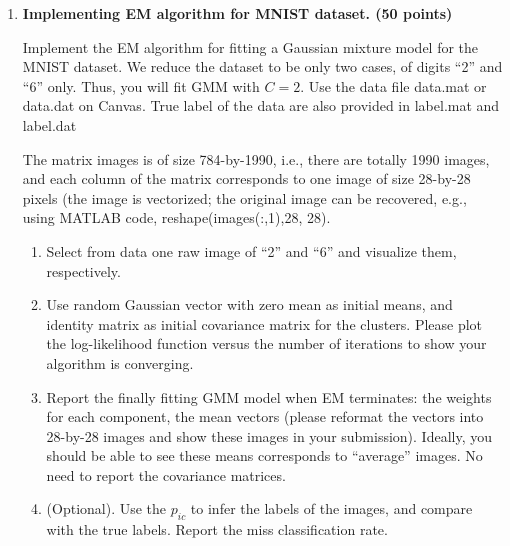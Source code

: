 \documentclass[twoside,10pt]{article}
\begin{document}
\begin{enumerate}
\item {\bf Implementing EM algorithm for MNIST dataset. (50 points)} 

 Implement the EM algorithm for fitting a Gaussian mixture model for the MNIST dataset. We reduce the dataset to be only two cases, of digits ``2'' and ``6'' only. Thus, you will fit GMM with $C = 2$. Use the data file \textsf{data.mat} or \textsf{data.dat} on Canvas. True label of the data are also provided in \textsf{label.mat} and \textsf{label.dat}

The matrix \textsf{images} is of size 784-by-1990, i.e., there are totally 1990 images, and each column of the matrix corresponds to one image of size 28-by-28 pixels (the image is vectorized; the original image can be recovered, e.g., using MATLAB code, \textsf{reshape(images(:,1),28, 28)}.


\begin{enumerate}

\item Select from data one raw image of ``2'' and ``6'' and visualize them, respectively. 

\item Use random Gaussian vector with zero mean as initial means, and identity matrix as initial covariance matrix for the clusters. Please plot the log-likelihood function versus the number of iterations to show your algorithm is converging.

\item  Report the finally fitting GMM model when EM terminates: the weights for each component, the mean vectors (please reformat the vectors into 28-by-28 images and show these images in your submission). Ideally, you should be able to see these means corresponds to ``average'' images.  No need to report the covariance matrices. 

\item (Optional). Use the $p_{ic}$ to infer the labels of the images, and compare with the true labels. Report the miss classification rate.  


\end{enumerate}

\end{enumerate}
\end{document}
